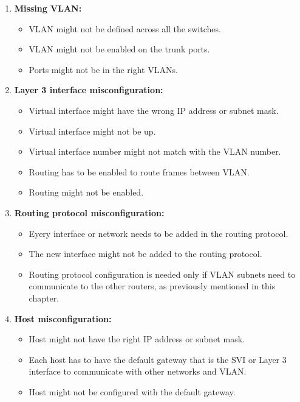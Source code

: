 \begin{enumerate}
    \item \textbf{Missing VLAN:}
    \begin{itemize}
        \item VLAN might not be defined across all the switches.
        \item VLAN might not be enabled on the trunk ports.
        \item Ports might not be in the right VLANs.
    \end{itemize}
    \item \textbf{Layer 3 interface misconfiguration:}
    \begin{itemize}
        \item Virtual interface might have the wrong IP address or subnet mask.
        \item Virtual interface might not be up.
        \item Virtual interface number might not match with the VLAN number.
        \item Routing has to be enabled to route frames between VLAN.
        \item Routing might not be enabled.
    \end{itemize}
    \item \textbf{Routing protocol misconfiguration:}
    \begin{itemize}
        \item Eyery interface or network needs to be added in the routing protocol.
        \item The new interface might not be added to the routing protocol.
        \item Routing protocol configuration is needed only if VLAN subnets need to communicate to the other routers, as previously
        mentioned in this chapter.
    \end{itemize}
    \item \textbf{Host misconfiguration:}
    \begin{itemize}
        \item Host might not have the right IP address or subnet mask.
        \item Each host has to have the default gateway that is the SVI or Layer 3 interface to communicate with other networks and VLAN.
        \item Host might not be configured with the default gateway.
    \end{itemize}
\end{enumerate}
